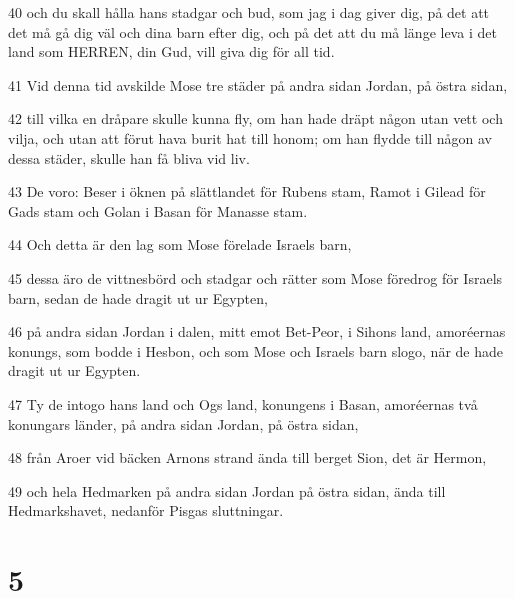 \par 40 och du skall hålla hans stadgar och bud, som jag i dag giver dig, på det att det må gå dig väl och dina barn efter dig, och på det att du må länge leva i det land som HERREN, din Gud, vill giva dig för all tid.
\par 41 Vid denna tid avskilde Mose tre städer på andra sidan Jordan, på östra sidan,
\par 42 till vilka en dråpare skulle kunna fly, om han hade dräpt någon utan vett och vilja, och utan att förut hava burit hat till honom; om han flydde till någon av dessa städer, skulle han få bliva vid liv.
\par 43 De voro: Beser i öknen på slättlandet för Rubens stam, Ramot i Gilead för Gads stam och Golan i Basan för Manasse stam.
\par 44 Och detta är den lag som Mose förelade Israels barn,
\par 45 dessa äro de vittnesbörd och stadgar och rätter som Mose föredrog för Israels barn, sedan de hade dragit ut ur Egypten,
\par 46 på andra sidan Jordan i dalen, mitt emot Bet-Peor, i Sihons land, amoréernas konungs, som bodde i Hesbon, och som Mose och Israels barn slogo, när de hade dragit ut ur Egypten.
\par 47 Ty de intogo hans land och Ogs land, konungens i Basan, amoréernas två konungars länder, på andra sidan Jordan, på östra sidan,
\par 48 från Aroer vid bäcken Arnons strand ända till berget Sion, det är Hermon,
\par 49 och hela Hedmarken på andra sidan Jordan på östra sidan, ända till Hedmarkshavet, nedanför Pisgas sluttningar.

\chapter{5}

